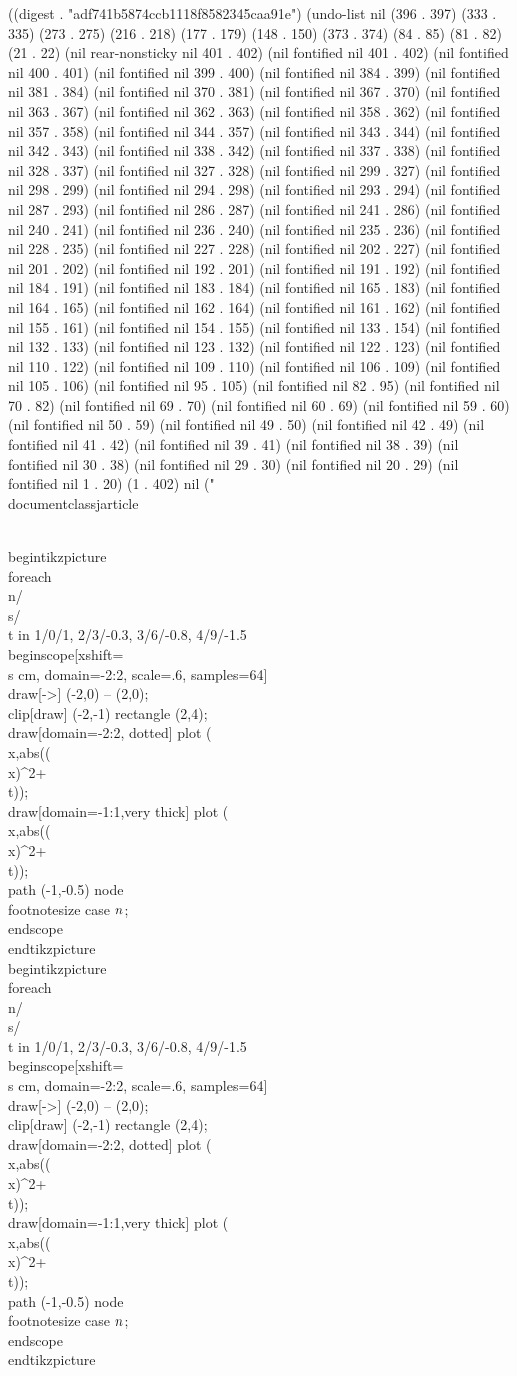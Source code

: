 ((digest . "adf741b5874ccb1118f8582345caa91e") (undo-list nil (396 . 397) (333 . 335) (273 . 275) (216 . 218) (177 . 179) (148 . 150) (373 . 374) (84 . 85) (81 . 82) (21 . 22) (nil rear-nonsticky nil 401 . 402) (nil fontified nil 401 . 402) (nil fontified nil 400 . 401) (nil fontified nil 399 . 400) (nil fontified nil 384 . 399) (nil fontified nil 381 . 384) (nil fontified nil 370 . 381) (nil fontified nil 367 . 370) (nil fontified nil 363 . 367) (nil fontified nil 362 . 363) (nil fontified nil 358 . 362) (nil fontified nil 357 . 358) (nil fontified nil 344 . 357) (nil fontified nil 343 . 344) (nil fontified nil 342 . 343) (nil fontified nil 338 . 342) (nil fontified nil 337 . 338) (nil fontified nil 328 . 337) (nil fontified nil 327 . 328) (nil fontified nil 299 . 327) (nil fontified nil 298 . 299) (nil fontified nil 294 . 298) (nil fontified nil 293 . 294) (nil fontified nil 287 . 293) (nil fontified nil 286 . 287) (nil fontified nil 241 . 286) (nil fontified nil 240 . 241) (nil fontified nil 236 . 240) (nil fontified nil 235 . 236) (nil fontified nil 228 . 235) (nil fontified nil 227 . 228) (nil fontified nil 202 . 227) (nil fontified nil 201 . 202) (nil fontified nil 192 . 201) (nil fontified nil 191 . 192) (nil fontified nil 184 . 191) (nil fontified nil 183 . 184) (nil fontified nil 165 . 183) (nil fontified nil 164 . 165) (nil fontified nil 162 . 164) (nil fontified nil 161 . 162) (nil fontified nil 155 . 161) (nil fontified nil 154 . 155) (nil fontified nil 133 . 154) (nil fontified nil 132 . 133) (nil fontified nil 123 . 132) (nil fontified nil 122 . 123) (nil fontified nil 110 . 122) (nil fontified nil 109 . 110) (nil fontified nil 106 . 109) (nil fontified nil 105 . 106) (nil fontified nil 95 . 105) (nil fontified nil 82 . 95) (nil fontified nil 70 . 82) (nil fontified nil 69 . 70) (nil fontified nil 60 . 69) (nil fontified nil 59 . 60) (nil fontified nil 50 . 59) (nil fontified nil 49 . 50) (nil fontified nil 42 . 49) (nil fontified nil 41 . 42) (nil fontified nil 39 . 41) (nil fontified nil 38 . 39) (nil fontified nil 30 . 38) (nil fontified nil 29 . 30) (nil fontified nil 20 . 29) (nil fontified nil 1 . 20) (1 . 402) nil ("\\documentclass{jarticle}
\begin{document}
\\begin{tikzpicture}
 \\foreach \\n/\\s/\\t in {1/0/1, 2/3/-0.3, 3/6/-0.8, 4/9/-1.5}
 {
 \\begin{scope}[xshift=\\s cm, domain=-2:2, scale=.6, samples=64]
  \\draw[->] (-2,0) -- (2,0);
  \\clip[draw] (-2,-1) rectangle (2,4);
  \\draw[domain=-2:2, dotted] plot (\\x,{abs((\\x)^2+\\t)});
  \\draw[domain=-1:1,very thick] plot (\\x,{abs((\\x)^2+\\t)});
  \\path (-1,-0.5) node {\\footnotesize case $\\n$};
 \\end{scope}
 }
\\end{tikzpicture}
\\begin{tikzpicture}
\\foreach \\n/\\s/\\t in {1/0/1, 2/3/-0.3, 3/6/-0.8, 4/9/-1.5}
{
\\begin{scope}[xshift=\\s cm, domain=-2:2, scale=.6, samples=64]
\\draw[->] (-2,0) -- (2,0);
\\clip[draw] (-2,-1) rectangle (2,4);
\\draw[domain=-2:2, dotted] plot (\\x,{abs((\\x)^2+\\t)});
\\draw[domain=-1:1,very thick] plot (\\x,{abs((\\x)^2+\\t)});
\\path (-1,-0.5) node {\\footnotesize case $\\n$};
\\end{scope}
}
\\end{tikzpicture}

\
\end{document}
